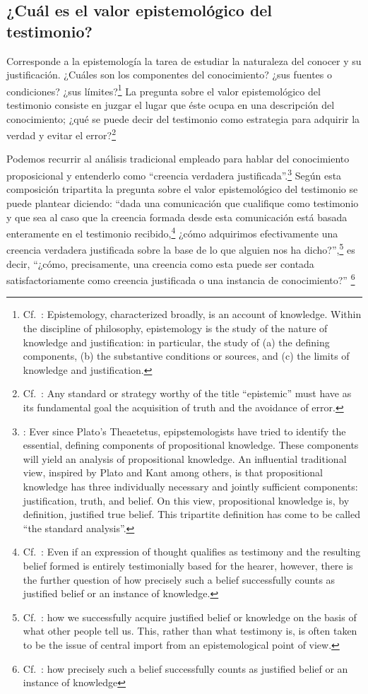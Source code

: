 \subsection{¿Cuál es el valor epistemológico del testimonio?}
Corresponde a la epistemología la tarea de estudiar la naturaleza del conocer y
su justificación. ¿Cuáles son los componentes del conocimiento? ¿sus fuentes o
condiciones? ¿sus límites?\footnote{Cf.~\cite[3]{moser2002ep}: Epistemology,
  characterized broadly, is an account of knowledge. Within the discipline of
  philosophy, epistemology is the study of the nature of knowledge and
  justification: in particular, the study of (a) the defining components, (b)
  the substantive conditions or sources, and (c) the limits of knowledge and
  justification.} La pregunta sobre el valor epistemológico del testimonio
consiste en juzgar el lugar que éste ocupa en una descripción del conocimiento;
¿qué se puede decir del testimonio como estrategia para adquirir la verdad y
evitar el error?\footnote{Cf.~\cite[14]{moser2002ep}: Any standard or strategy
  worthy of the title ``epistemic'' must have as its fundamental goal the
  acquisition of truth and the avoidance of error.}

Podemos recurrir al análisis tradicional empleado para hablar del conocimiento
proposicional y entenderlo como \enquote{creencia verdadera
  justificada}.\footnote{\cite[4]{moser2002ep}: Ever since Plato's Theaetetus,
  epipstemologists have tried to identify the essential, defining components of
  propositional knowledge. These components will yield an analysis of
  propositional knowledge. An influential traditional view, inspired by Plato
  and Kant among others, is that propositional knowledge has three individually
  necessary and jointly sufficient components: justification, truth, and belief.
  On this view, propositional knowledge is, by definition, justified true
  belief. This tripartite definition has come to be called ``the standard
  analysis''.} Según esta composición tripartita la pregunta sobre el valor
epistemológico del testimonio se puede plantear diciendo: \enquote{dada una
  comunicación que cualifique como testimonio y que sea al caso que la creencia
  formada desde esta comunicación está basada enteramente en el testimonio
  recibido,\footnote{Cf.~\cite[4]{lackeysosa2006eptest}: Even if an expression
    of thought qualifies as testimony and the resulting belief formed is
    entirely testimonially based for the hearer, however, there is the further
    question of how precisely such a belief successfully counts as justified
    belief or an instance of knowledge.} ¿cómo adquirimos efectivamente una
  creencia verdadera justificada sobre la base de lo que alguien nos ha
  dicho?},\footnote{Cf.~\cite[2]{lackeysosa2006eptest}: how we successfully
  acquire justified belief or knowledge on the basis of what other people tell
  us. This, rather than what testimony is, is often taken to be the issue of
  central import from an epistemological point of view.} es decir,
\enquote{¿cómo, precisamente, una creencia como esta puede ser contada
  satisfactoriamente como creencia justificada o una instancia de conocimiento?}
\footnote{Cf.~\cite[4]{lackeysosa2006eptest}: how precisely such a belief
  successfully counts as justified belief or an instance of knowledge}

